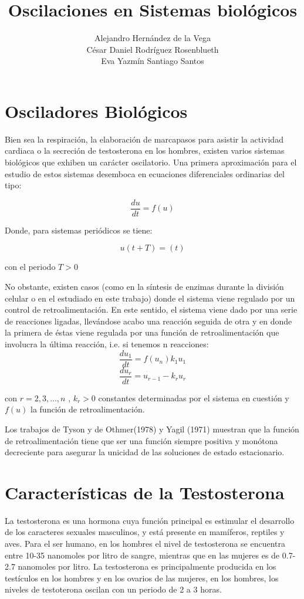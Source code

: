 \documentclass[letter,11pt]{article}
\title{Oscilaciones en Sistemas biológicos}
\author{Alejandro Hernández de la Vega \\ César Daniel Rodríguez Rosenblueth \\ Eva Yazmín Santiago Santos}
\date{}
\begin{document}
\maketitle

\tableofcontents

\pagebreak


\section{Osciladores Biológicos}

Bien sea la respiración, la elaboración de marcapasos para asistir la actividad cardiaca o la secreción de testosterona en los hombres, existen varios sistemas biológicos que exhiben un carácter oscilatorio. Una primera aproximación para el estudio de estos sistemas desemboca en ecuaciones diferenciales ordinarias del tipo:

$$\dfrac{du}{dt} = f(u)$$

Donde, para sistemas periódicos se tiene:

$$u(t+T)= (t) $$

con el periodo $T>0$

No obstante, existen casos (como en la síntesis de enzimas durante la división celular o en el estudiado en este trabajo) donde el sistema viene regulado por un control de retroalimentación. En este sentido, el sistema viene dado por una serie de reacciones ligadas, llevándose acabo una reacción seguida de otra y en donde la primera de éstas viene regulada por una función de retroalimentación que involucra la última reacción, i.e. si tenemos n reacciones:
$$ \dfrac{d u_1}{dt} = f(u_n )k_1 u_1 $$ 
$$ \dfrac{d u_r}{dt}= u_{r-1} -k_r u_r $$

con $r=2,3,...,n$ , $ k_r > 0 $ constantes determinadas por el sistema en cuestión y $ f(u)$ la función de retroalimentación.

Los trabajos de Tyson y de Othmer(1978) y Yagil (1971) muestran que la función de retroalimentación tiene que ser una función siempre positiva y monótona decreciente para asegurar la unicidad de las soluciones de estado estacionario.

\section{Características de la Testosterona}

La testosterona es una hormona cuya función principal es estimular el desarrollo de los caracteres sexuales masculinos, y está presente en mamíferos, reptiles y aves. Para el ser humano, en los hombres el nivel de testosterona se encuentra entre 10-35 nanomoles por litro de sangre, mientras que en las mujeres es de 0.7-2.7 nanomoles por litro. La testosterona es principalmente producida en los testículos en los hombres y en los ovarios de las mujeres, en los hombres, los niveles de testoterona oscilan con un periodo de 2 a 3 horas.
\end{document}

